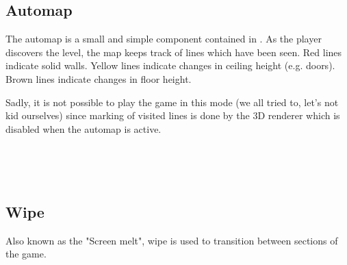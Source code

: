 \subsection{Automap}
The automap is a small and simple component contained in . As the player discovers the level, the map keeps track of lines which have been seen. Red lines indicate solid walls. Yellow lines indicate changes in ceiling height (e.g. doors). Brown lines indicate changes in floor height.\\
\par
Sadly, it is not possible to play the game in this mode (we all tried to, let's not kid ourselves) since marking of visited lines is done by the 3D renderer which is disabled when the automap is active.\\
\par
{}
\par
{}\\
\par
{}\\
\par






\subsection{Wipe}
\label{label_melt}
Also known as the "Screen melt", wipe is used to transition between sections of the game.

\par
{}

 \vspace{10pt}
\pagebreak


 \vspace{10pt}
\pagebreak

